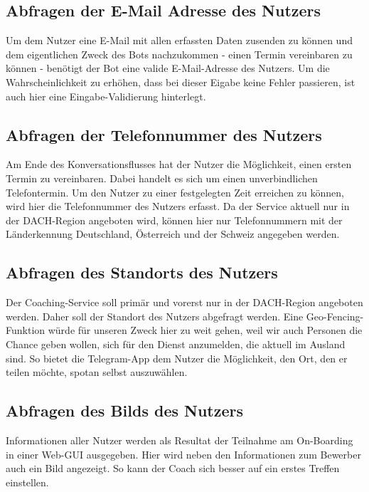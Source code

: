         \subsection{Abfragen der E-Mail Adresse des Nutzers}
            Um dem Nutzer eine E-Mail mit allen erfassten Daten zusenden zu können und dem eigentlichen Zweck des Bots nachzukommen - einen Termin vereinbaren zu können - benötigt der Bot eine valide E-Mail-Adresse des Nutzers. Um die Wahrscheinlichkeit zu erhöhen, dass bei dieser Eigabe keine Fehler passieren, ist auch hier eine Eingabe-Validierung hinterlegt.
        
        \subsection{Abfragen der Telefonnummer des Nutzers}
            Am Ende des Konversationsflusses hat der Nutzer die Möglichkeit, einen ersten Termin zu vereinbaren. Dabei handelt es sich um einen unverbindlichen Telefontermin. Um den Nutzer zu einer festgelegten Zeit erreichen zu können, wird hier die Telefonnummer des Nutzers erfasst. Da der Service aktuell nur in der DACH-Region angeboten wird, können hier nur Telefonnummern mit der Länderkennung Deutschland, Österreich und der Schweiz angegeben werden. 
        
        \subsection{Abfragen des Standorts des Nutzers}
            Der Coaching-Service soll primär und vorerst nur in der DACH-Region angeboten werden. Daher soll der Standort des Nutzers abgefragt werden. Eine Geo-Fencing-Funktion würde für unseren Zweck hier zu weit gehen, weil wir auch Personen die Chance geben wollen, sich für den Dienst anzumelden, die aktuell im Ausland sind. So bietet die Telegram-App dem Nutzer die Möglichkeit, den Ort, den er teilen möchte, spotan selbst auszuwählen.
        
        \subsection{Abfragen des Bilds des Nutzers}
        Informationen aller Nutzer werden als Resultat der Teilnahme am On-Boarding in einer Web-GUI ausgegeben. Hier wird neben den Informationen zum Bewerber auch ein Bild angezeigt. So kann der Coach sich besser auf ein erstes Treffen einstellen. 
        
